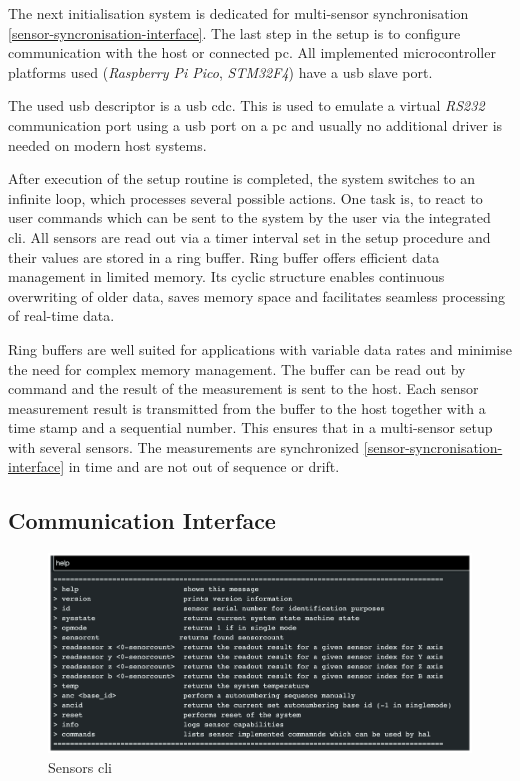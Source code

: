The next initialisation system is dedicated for multi-sensor
synchronisation \ref{sensor-syncronisation-interface}. The last step in
the setup is to configure communication with the host or connected
\gls{pc}. All implemented microcontroller platforms used
(\emph{Raspberry Pi Pico}, \emph{STM32F4}) have a \gls{usb} slave port.

The used usb descriptor is a \gls{usb} \gls{cdc}. This is used to
emulate a virtual \emph{RS232} communication port using a \gls{usb} port
on a \gls{pc} and usually no additional driver is needed on modern host
systems.

After execution of the setup routine is completed, the system switches
to an infinite loop, which processes several possible actions. One task
is, to react to user commands which can be sent to the system by the
user via the integrated \gls{cli}. All sensors are read out via a timer
interval set in the setup procedure and their values are stored in a
ring buffer. Ring buffer offers efficient data management in limited
memory. Its cyclic structure enables continuous overwriting of older
data, saves memory space and facilitates seamless processing of
real-time data.

Ring buffers are well suited for applications with variable data rates
and minimise the need for complex memory management. The buffer can be
read out by command and the result of the measurement is sent to the
host. Each sensor measurement result is transmitted from the buffer to
the host together with a time stamp and a sequential number. This
ensures that in a multi-sensor setup with several sensors. The
measurements are synchronized \ref{sensor-syncronisation-interface} in
time and are not out of sequence or drift.

\hypertarget{communication-interface}{%
\subsection{Communication Interface}\label{communication-interface}}

\begin{figure}
\centering
\includegraphics{./generated_images/border_Sensors_(+cli).png}
\caption{Sensors \gls{cli} \label{Sensors_(+cli).png}}
\end{figure}

